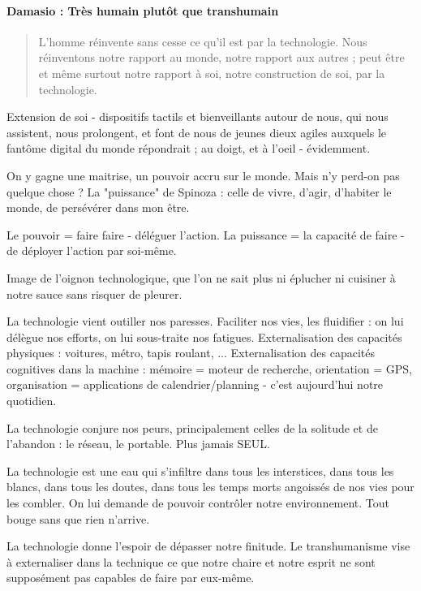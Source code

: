 \paragraph{Damasio : Très humain plutôt que transhumain}

\begin{quotation}
    L'homme réinvente sans cesse ce qu'il est par la technologie. Nous réinventons notre
    rapport au monde, notre rapport aux autres ; peut être et même surtout notre rapport à soi, 
    notre construction de soi, par la technologie. \cite{Damasio2}
\end{quotation}

Extension de soi - dispositifs tactils et bienveillants autour de nous, qui nous assistent,
nous prolongent, et font de nous de jeunes dieux agiles auxquels le fantôme digital du monde répondrait
; au doigt, et à l'oeil - évidemment.

On y gagne une maitrise, un pouvoir accru sur le monde. Mais n'y perd-on pas quelque chose ?
La "puissance" de Spinoza : celle de vivre, d'agir, d'habiter le monde, de persévérer dans mon être.

Le pouvoir = faire faire - déléguer l'action.
La puissance = la capacité de faire - de déployer l'action par soi-même.

Image de l'oignon technologique, que l'on ne sait plus ni éplucher ni cuisiner à notre
sauce sans risquer de pleurer.

La technologie vient outiller nos paresses. Faciliter nos vies, les fluidifier : on lui
délègue nos efforts, on lui sous-traite nos fatigues. Externalisation des capacités physiques :
voitures, métro, tapis roulant, ... Externalisation des capacités cognitives dans la machine :
mémoire = moteur de recherche, orientation = GPS, organisation = applications de
calendrier/planning - c'est aujourd'hui notre quotidien.

La technologie conjure nos peurs, principalement celles de la solitude et de l'abandon :
le réseau, le portable. Plus jamais SEUL.

La technologie est une eau qui s'infiltre dans tous les interstices, dans tous les blancs,
dans tous les doutes, dans tous les temps morts angoissés de nos vies pour les combler.
On lui demande de pouvoir contrôler notre environnement. Tout bouge sans que rien n'arrive. 

La technologie donne l'espoir de dépasser notre finitude. Le transhumanisme vise à
externaliser dans la technique ce que notre chaire et notre esprit ne sont supposément
pas capables de faire par eux-même.

